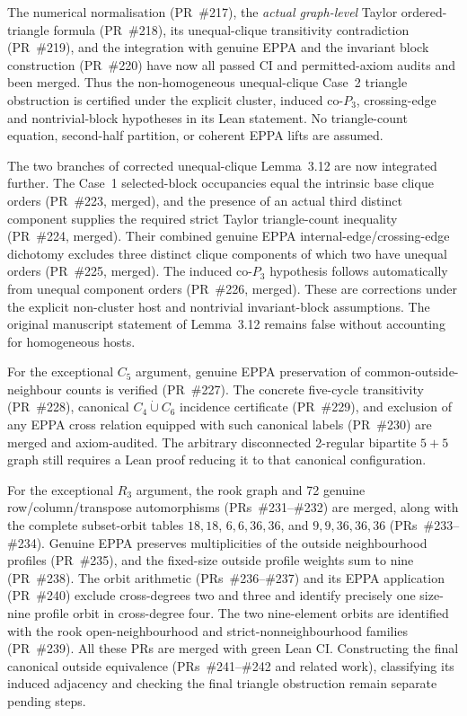 \documentclass[11pt,a4paper]{article}
\begin{document}
The numerical normalisation (PR~\#217), the
\emph{actual graph-level} Taylor ordered-triangle formula
(PR~\#218), its unequal-clique transitivity contradiction
(PR~\#219), and the integration with genuine EPPA and the
invariant block construction (PR~\#220) have now all
passed CI and permitted-axiom audits and been merged.
Thus the non-homogeneous unequal-clique Case~2
triangle obstruction is certified under the explicit
cluster, induced co-\(P_3\), crossing-edge and
nontrivial-block hypotheses in its Lean statement.
No triangle-count equation, second-half partition,
or coherent EPPA lifts are assumed.

The two branches of corrected unequal-clique
Lemma~3.12 are now integrated further. The Case~1
selected-block occupancies equal the intrinsic base clique
orders (PR~\#223, merged), and the presence of an actual
third distinct component supplies the required strict
Taylor triangle-count inequality (PR~\#224, merged).
Their combined genuine EPPA internal-edge/crossing-edge
dichotomy excludes three distinct clique components of
which two have unequal orders (PR~\#225, merged).
The induced co-\(P_3\) hypothesis follows automatically
from unequal component orders (PR~\#226, merged).
These are corrections under the explicit non-cluster
host and nontrivial invariant-block assumptions.
The original manuscript statement of Lemma~3.12 remains
false without accounting for homogeneous hosts.

For the exceptional \(C_5\) argument, genuine EPPA
preservation of common-outside-neighbour counts is verified
(PR~\#227). The concrete five-cycle transitivity
(PR~\#228), canonical \(C_4\dot\cup C_6\) incidence
certificate (PR~\#229), and exclusion of any EPPA
cross relation equipped with such canonical labels
(PR~\#230) are merged and axiom-audited.
The arbitrary disconnected 2-regular bipartite
\(5+5\) graph still requires a Lean proof reducing
it to that canonical configuration.

For the exceptional \(R_3\) argument, the rook graph
and 72 genuine row/column/transpose automorphisms
(PRs~\#231--\#232) are merged, along with
the complete subset-orbit tables
\(18,18\), \(6,6,36,36\), and
\(9,9,36,36,36\) (PRs~\#233--\#234).
Genuine EPPA preserves multiplicities of the outside
neighbourhood profiles (PR~\#235), and the fixed-size
outside profile weights sum to nine (PR~\#238).
The orbit arithmetic (PRs~\#236--\#237) and
its EPPA application (PR~\#240) exclude cross-degrees
two and three and identify precisely one size-nine
profile orbit in cross-degree four. The two nine-element
orbits are identified with the rook open-neighbourhood
and strict-nonneighbourhood families (PR~\#239).
All these PRs are merged with green Lean CI.
Constructing the final canonical outside equivalence
(PRs~\#241--\#242 and related work), classifying
its induced adjacency and checking the final triangle
obstruction remain separate pending steps.
\end{document}
